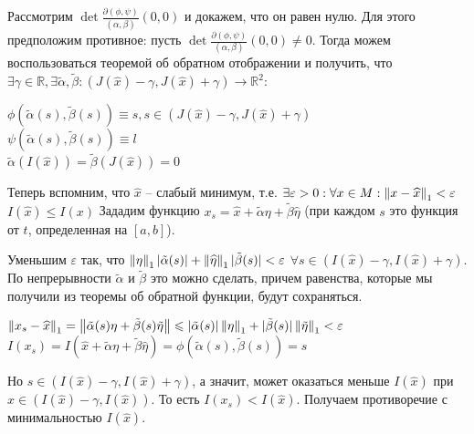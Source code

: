 Рассмотрим $\det \frac{\partial (\phi, \psi)}{(\alpha, \beta)}(0,0)$ и докажем, что он равен нулю. Для этого предположим противное:
пусть $\det \frac{\partial (\phi, \psi)}{(\alpha, \beta)}(0,0) \ne 0$. Тогда можем воспользоваться теоремой об обратном отображении и получить, что $\exists \gamma \in \mathbb{R}, \exists \tilde \alpha, \tilde \beta \colon (J(\widehat x) - \gamma, J(\widehat x) + \gamma) \to \mathbb{R}^2$:

\begin{center}
    $\phi(\tilde{\alpha}(s), \tilde{\beta}(s)) \equiv s, s \in (J(\widehat x) - \gamma, J(\widehat x) + \gamma)$\\
    $\psi(\tilde{\alpha}(s), \tilde{\beta}(s)) \equiv l$\\
    $\tilde{\alpha}(I(\widehat x)) = \tilde{\beta}(J(\widehat x)) = 0$
\end{center}
Теперь вспомним, что $\widehat x$ -- слабый минимум, т.е. $\exists \varepsilon > 0: \forall x \in M:  \left\| x - \widehat x \right\|_1 < \varepsilon$ $I(\widehat x) \le I(x)$
Зададим функцию $x_s = \widehat x + \tilde{\alpha} \eta + \tilde{\beta} \widehat \eta$ (при каждом $s$ это функция от $t$, определенная на $[a,b]$).
 
Уменьшим $\varepsilon$ так, что $\left\| \eta \right\|_1 |\tilde {\alpha}(s)| + \left\| \widehat \eta \right\|_1 |\tilde {\beta}(s)| < \varepsilon $ $\forall s \in (I(\widehat x) - \gamma, I(\widehat x) + \gamma)$. По непрерывности $\tilde {\alpha}$ и $\tilde {\beta}$ это можно сделать, причем равенства, которые мы получили из теоремы об обратной функции, будут сохраняться.

\begin{center}
$\left\| x_s - \widehat x \right\|_1 = \left\| \tilde{\alpha}(s) \eta + \tilde{\beta}(s) \tilde{\eta}  \right\| \leqslant |\tilde \alpha (s)| \left\| \eta \right\|_1 + |\tilde \beta (s)| \left\| \tilde {\eta} \right\|_1 < \varepsilon$ \\
$I(x_s) = I(\widehat x + \tilde{\alpha} \eta + \tilde{\beta} \widehat \eta) = \phi(\tilde \alpha (s), \tilde \beta (s)) = s$
\end{center}
Но $s \in (I(\widehat x) - \gamma, I(\widehat x) + \gamma)$, а значит, может оказаться меньше $I(\widehat x)$ при $x \in (I(\widehat x) - \gamma, I(\widehat x))$. То есть $I(x_s) < I(\widehat x)$. Получаем противоречие с минимальностью $I(\widehat x)$.

